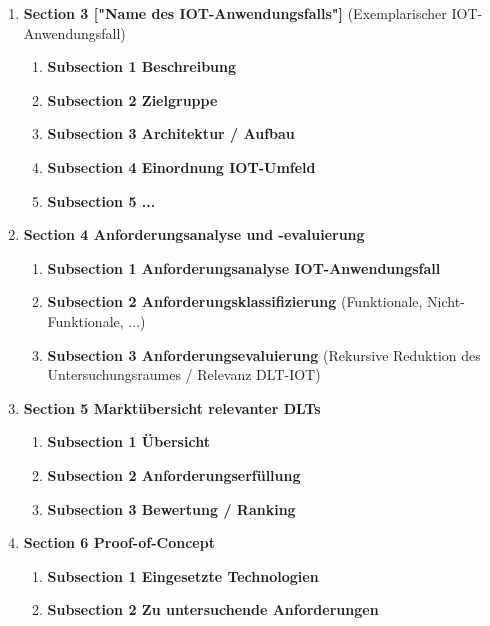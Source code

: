 \documentclass[
    ngerman,american
    ]{scrartcl}
\begin{document}
\begin{enumerate}
\begin{enumerate}
                    \end{enumerate}
            \item \textbf{Section 3 ["Name des IOT-Anwendungsfalls"]} (Exemplarischer IOT-Anwendungsfall)
                    \begin{enumerate}
                        \item \textbf{Subsection 1 Beschreibung}
                        \item \textbf{Subsection 2 Zielgruppe}
                        \item \textbf{Subsection 3 Architektur / Aufbau}
                        \item \textbf{Subsection 4 Einordnung IOT-Umfeld}
                        \item \textbf{Subsection 5 ...}
                    \end{enumerate}
            \item \textbf{Section 4 Anforderungsanalyse und -evaluierung}
                    \begin{enumerate}
                        \item \textbf{Subsection 1 Anforderungsanalyse IOT-Anwendungsfall}
                        \item \textbf{Subsection 2 Anforderungsklassifizierung} (Funktionale, Nicht-Funktionale, ...)
                        \item \textbf{Subsection 3 Anforderungsevaluierung} (Rekursive Reduktion des Untersuchungsraumes / Relevanz DLT-IOT)
                    \end{enumerate}
            \item \textbf{Section 5 Marktübersicht relevanter DLTs}
                    \begin{enumerate}
                        \item \textbf{Subsection 1 Übersicht}
                        \item \textbf{Subsection 2 Anforderungserfüllung}
                        \item \textbf{Subsection 3 Bewertung / Ranking}
                    \end{enumerate}
            \item \textbf{Section 6 Proof-of-Concept}
                    \begin{enumerate}
                        \item \textbf{Subsection 1 Eingesetzte Technologien}
                        \item \textbf{Subsection 2 Zu untersuchende Anforderungen}

\end{enumerate}
\end{enumerate}
\end{document}
